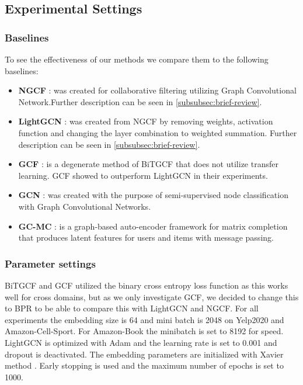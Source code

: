 \subsection{Experimental Settings}

\subsubsection{Baselines}
To see the effectiveness of our methods we compare them to the following baselines:
\begin{itemize}
    \item \textbf{NGCF} \cite{NGCF_2019}: was created for collaborative filtering utilizing Graph Convolutional Network.Further description can be seen in \autoref{subsubsec:brief-review}.
    \item \textbf{LightGCN} \cite{lightgcn}: was created from NGCF by removing weights, activation function and changing the layer combination to weighted summation. Further description can be seen in \autoref{subsubsec:brief-review}.
    \item \textbf{GCF} \cite{BiTGCF}: is a degenerate method of BiTGCF that does not utilize transfer learning. GCF showed to outperform LightGCN in their experiments.
    \item \textbf{GCN} \cite{GCN}: was created with the purpose of semi-supervised node classification with Graph Convolutional Networks. 
    \item \textbf{GC-MC} \cite{GC_MC}: is a graph-based auto-encoder framework for matrix completion that produces latent features for users and items with message passing.
\end{itemize}

\subsubsection{Parameter settings}
BiTGCF and GCF utilized the binary cross entropy loss function as this works well for cross domains, but as we only investigate GCF, we decided to change this to BPR to be able to compare this with LightGCN and NGCF.
For all experiments the embedding size is 64 and mini batch is 2048 on Yelp2020 and Amazon-Cell-Sport.
For Amazon-Book the minibatch is set to 8192 for speed.
LightGCN is optimized with Adam \cite{Adam} and the learning rate is set to 0.001 and dropout is deactivated.
The embedding parameters are initialized with Xavier method \cite{Xavier,lightgcn}.
Early stopping is used and the maximum number of epochs is set to 1000.